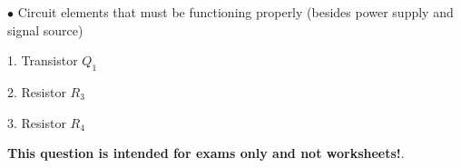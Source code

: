 \medskip
\goodbreak
\item{$\bullet$} Circuit elements that must be functioning properly (besides power supply and signal source)
\item{1.} Transistor $Q_1$
\item{2.} Resistor $R_3$
\item{3.} Resistor $R_4$
\medskip







{\bf This question is intended for exams only and not worksheets!}.




